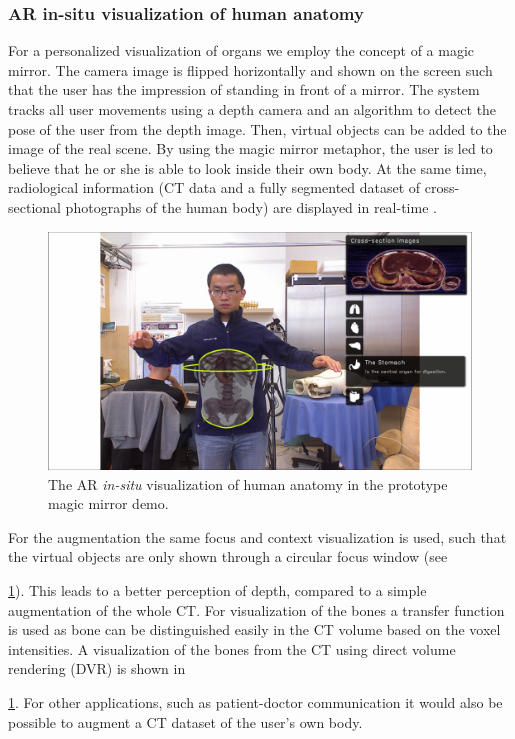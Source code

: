 {{\subsubsection{AR in-situ visualization of human anatomy}
For a personalized visualization of organs we employ the concept of a magic mirror. The camera image is flipped horizontally and shown on the screen such that the user has the impression of standing in front of a mirror. The system tracks all user movements using a depth camera and an algorithm to detect the pose of the user from the depth image. Then, virtual objects can be added to the image of the real scene. By using the magic mirror metaphor, the user is led to believe that he or she is able to look inside their own body. At the same time, radiological information (CT data and a fully segmented dataset of cross-sectional photographs of the human body) are displayed in real-time \cite{Blum2012}.
\begin{figure}
	\centering
	\includegraphics[width=0.7\linewidth]{figures/3-MMC/Mirracle}
	\caption[Magic Mirror Demo]{The AR \textit{in-situ} visualization of human anatomy in the prototype magic mirror demo.}
	\label{fig:3-MMC:Mirracle}
\end{figure}
For the augmentation the same focus and context visualization \cite{Bichlmeier2007} is used, such that the virtual objects are only shown through a circular focus window (see \figurename{\ref{fig:3-MMC:Mirracle}). This leads to a better perception of depth, compared to a simple augmentation of the whole CT. 
For visualization of the bones a transfer function is used as bone can be distinguished easily in the CT volume based on the voxel intensities. A visualization of the bones from the CT using direct volume rendering (DVR) is shown in \figurename{\ref{fig:3-MMC:Mirracle}. For other applications, such as patient-doctor communication it would also be possible to augment a CT dataset of the user's own body.

}}}}
